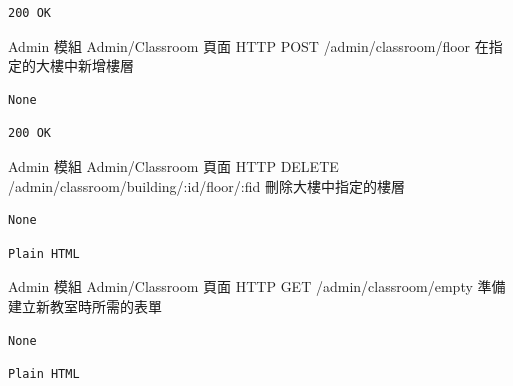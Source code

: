 \documentclass{article}
\begin{document}
\begin{lrbox}{\jsonoutputbox}
	\begin{lstlisting}
200 OK
\end{lstlisting}
\end{lrbox}

{Admin 模組}
{Admin/Classroom 頁面}
{HTTP POST}
{/admin/classroom/floor}
{在指定的大樓中新增樓層}

\bigskip

\begin{lrbox}{\jsoninputbox}
	\begin{lstlisting}
None
\end{lstlisting}
\end{lrbox}

\begin{lrbox}{\jsonoutputbox}
	\begin{lstlisting}
200 OK
\end{lstlisting}
\end{lrbox}

{Admin 模組}
{Admin/Classroom 頁面}
{HTTP DELETE}
{/admin/classroom/building/:id/floor/:fid}
{刪除大樓中指定的樓層}

\bigskip

\begin{lrbox}{\jsoninputbox}
	\begin{lstlisting}
None
\end{lstlisting}
\end{lrbox}

\begin{lrbox}{\jsonoutputbox}
	\begin{lstlisting}
Plain HTML
\end{lstlisting}
\end{lrbox}

{Admin 模組}
{Admin/Classroom 頁面}
{HTTP GET}
{/admin/classroom/empty}
{準備建立新教室時所需的表單}

\bigskip

\begin{lrbox}{\jsoninputbox}
	\begin{lstlisting}
None
\end{lstlisting}
\end{lrbox}

\begin{lrbox}{\jsonoutputbox}
	\begin{lstlisting}
Plain HTML
\end{lstlisting}
\end{lrbox}
\end{document}
